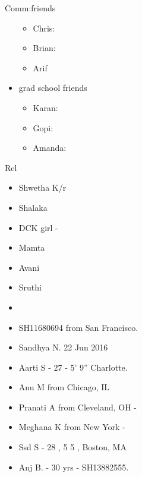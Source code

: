 \documentclass[serif, mathserif, final]{beamer}
\begin{document}
\begin{frame}[label=socialInt]
\begin{block}{Comm:friends}
\begin{itemize}
\begin{itemize}
          \item \tiny Chris: 
          \item \tiny Brian: 
          \item \tiny Arif 
          \end{itemize}
        \item grad school friends 
          \begin{itemize} 
            \tiny \item \tiny  Karan: 
          \item \tiny Gopi: 
          \item \tiny Amanda:  
          \end{itemize}
        \end{itemize} 
      \end{block}
     
      \begin{block}{Rel} 
        \begin{itemize} 
          \small \item \small Shwetha K/r
        \item \small Shalaka 
        \item \tiny DCK girl -
        \item \small Mamta
        \item \small Avani 
        \item \small Sruthi 
          \item \small 
        \item \small SH11680694 from San Francisco. 
        \item \small Sandhya N. 22 Jun 2016 
        \item \small Aarti S - 27 - 5' 9'' Charlotte.       
        \item \small Anu M from Chicago, IL 
        \item \small Pranati A from Cleveland, OH - 
        \item \small Meghana K from New York - 
        \item \small Ssd S - 28 , 5 5 , Boston, MA 
        \item \small Anj B. - 30 yrs - SH13882555.
        \end{itemize}
      \end{block} 

\end{frame}
\end{document}
